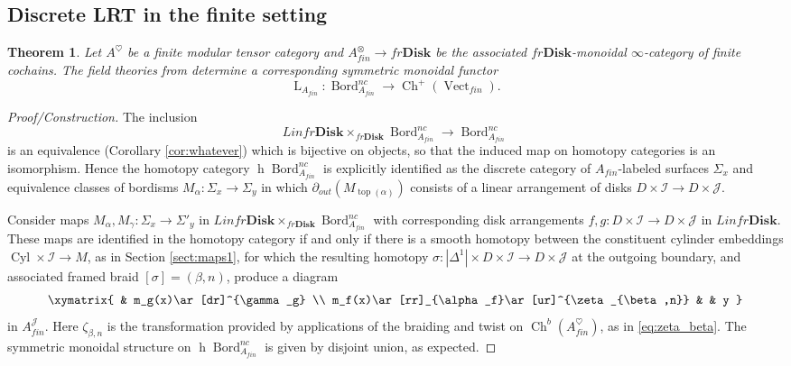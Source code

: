 \documentclass[reqno]{amsart}
\newtheorem{theorem}[lemma]{Theorem}
\theoremstyle{definition}
\newcommand{\mcl}[1]{\mathcal{#1}}
\newcommand{\opn}[1]{\operatorname{#1}}
\newcommand{\ot}{\otimes}
\newcommand{\Disk}{\mathbf{Disk}}
\newcommand{\dL}{\operatorname{L}}
\DeclareMathOperator{\Bord}{Bord}
\renewcommand{\1}{\mathbf{1}}
\begin{document}
\subsection{Discrete LRT in the finite setting}

\begin{theorem}\label{thm:fin_dis_lrt}
Let $A^{\heartsuit}$ be a finite modular tensor category and $A_{fin}^{\ot}\to fr\Disk$ be the associated $fr\Disk$-monoidal $\infty$-category of finite cochains.  The field theories from \cite{derenzietal23,czenkynegron} determine a corresponding symmetric monoidal functor
\[
\dL_{A_{fin}}:\Bord^{nc}_{A_{fin}}\to \opn{Ch}^+(\opn{Vect}_{fin}).
\]
\end{theorem}

\begin{proof}[Proof/Construction]
The inclusion
\[
Linfr\Disk\times_{fr\Disk}\Bord^{nc}_{A_{fin}}\to \Bord^{nc}_{A_{fin}}
\]
is an equivalence (Corollary \ref{cor:whatever}) which is bijective on objects, so that the induced map on homotopy categories is an isomorphism.  Hence the homotopy category $\opn{h}\Bord^{nc}_{A_{fin}}$ is explicitly identified as the discrete category of $A_{fin}$-labeled surfaces $\Sigma_x$ and equivalence classes of bordisms $M_{\alpha}:\Sigma_x\to \Sigma_y$ in which $\partial_{out}(M_{\opn{top}(\alpha)})$ consists of a linear arrangement of disks $D\times \mcl{I}\to D\times \mcl{J}$.
\par

Consider maps $M_{\alpha},M_{\gamma}:\Sigma_x\to \Sigma'_y$ in $Linfr\Disk\times_{fr\Disk}\Bord^{nc}_{A_{fin}}$ with corresponding disk arrangements $f,g:D\times\mcl{I}\to D\times\mcl{J}$ in $Linfr\Disk$. These maps are identified in the homotopy category if and only if there is a smooth homotopy between the constituent cylinder embeddings $\opn{Cyl}\times \mcl{I}\to M$, as in Section \ref{sect:maps1}, for which the resulting homotopy $\sigma:|\Delta^1|\times D\times\mcl{I}\to D\times\mcl{J}$ at the outgoing boundary, and associated framed braid $[\sigma]=(\beta,n)$, produce a diagram
\[
\xymatrix{
 & m_g(x)\ar[dr]^{\gamma_g} \\
m_f(x)\ar[rr]_{\alpha_f}\ar[ur]^{\zeta_{\beta,n}} & & y
}
\]
in $A_{fin}^{\mcl{J}}$.  Here $\zeta_{\beta,n}$ is the transformation provided by applications of the braiding and twist on $\opn{Ch}^b(A^{\heartsuit}_{fin})$, as in \eqref{eq:zeta_beta}.  The symmetric monoidal structure on $\opn{h}\Bord^{nc}_{A_{fin}}$ is given by disjoint union, as expected.
\par


\end{proof}
\end{document}

